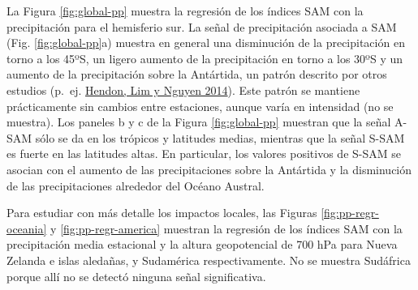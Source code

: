 \documentclass[12pt,oneside,a4paper]{reedthesis}
\begin{document}
La Figura \ref{fig:global-pp} muestra la regresión de los índices SAM con la precipitación para el hemisferio sur.
La señal de precipitación asociada a SAM (Fig. \ref{fig:global-pp}a) muestra en general una disminución de la precipitación en torno a los 45ºS, un ligero aumento de la precipitación en torno a los 30ºS y un aumento de la precipitación sobre la Antártida, un patrón descrito por otros estudios (p.~ej. \protect\hyperlink{ref-hendon2014}{Hendon, Lim y Nguyen 2014}).
Este patrón se mantiene prácticamente sin cambios entre estaciones, aunque varía en intensidad (no se muestra).
Los paneles b y c de la Figura \ref{fig:global-pp} muestran que la señal A-SAM sólo se da en los trópicos y latitudes medias, mientras que la señal S-SAM es fuerte en las latitudes altas.
En particular, los valores positivos de S-SAM se asocian con el aumento de las precipitaciones sobre la Antártida y la disminución de las precipitaciones alrededor del Océano Austral.

Para estudiar con más detalle los impactos locales, las Figuras \ref{fig:pp-regr-oceania} y \ref{fig:pp-regr-america} muestran la regresión de los índices SAM con la precipitación media estacional y la altura geopotencial de 700 hPa para Nueva Zelanda e islas aledañas, y Sudamérica respectivamente.
No se muestra Sudáfrica porque allí no se detectó ninguna señal significativa.
\end{document}
